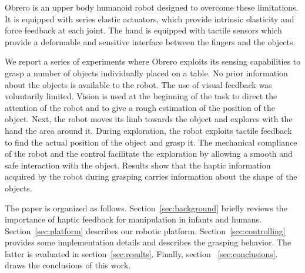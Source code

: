 Obrero\cite{obrero} is an upper body humanoid robot designed to
overcome these limitations. It is equipped with series elastic
actuators, which provide intrinsic elasticity and force feedback
at each joint. The hand is equipped with tactile sensors
\cite{etorresjSoft} which provide a deformable and sensitive
interface between the fingers and the objects.

We report a series of experiments where Obrero exploits its
sensing capabilities to grasp a number of objects individually
placed on a table. No prior information about the objects is
available to the robot. The use of visual feedback was voluntarily
limited. Vision is used at the beginning of the task to direct the
attention of the robot and to give a rough estimation of the
position of the object. Next, the robot moves its limb towards the
object and explores with the hand the area around it. During
exploration, the robot exploits tactile feedback to find the
actual position of the object and grasp it. The mechanical
compliance of the robot and the control facilitate the exploration
by allowing a smooth and safe interaction with the object. Results
show that the haptic information acquired by the robot during
grasping carries information about the shape of the objects.

The paper is organized as follows. Section~\ref{sec:background}
briefly reviews the importance of haptic feedback for manipulation
in infants and humans. Section~\ref{sec:platform} describes our
robotic platform. Section~\ref{sec:controlling} provides some
implementation details and describes the grasping behavior. The
latter is evaluated in section~\ref{sec:results}. Finally, section
~\ref{sec:conclusions}. draws the conclusions of this work.

